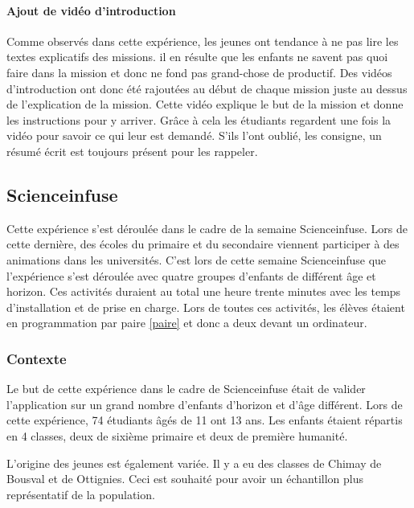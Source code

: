 \paragraph{Ajout de vidéo d'introduction}
Comme observés dans cette expérience, les jeunes ont tendance à ne pas lire les textes explicatifs des missions. il en  résulte que les enfants ne savent pas quoi faire dans la mission et donc ne fond pas grand-chose de productif. Des vidéos d'introduction ont donc été rajoutées au début de chaque mission juste au dessus de l'explication de la mission. Cette vidéo explique le but de la mission et donne les instructions pour y arriver. Grâce à cela les étudiants regardent une fois la vidéo pour savoir ce qui leur est demandé. S'ils l'ont oublié, les consigne, un résumé écrit est toujours présent pour les rappeler.


\subsection{Scienceinfuse}
Cette expérience s'est déroulée dans le cadre de la semaine Scienceinfuse. Lors de cette dernière, des écoles du primaire et du secondaire viennent participer à des animations dans les universités. C'est lors de cette semaine Scienceinfuse que l'expérience s'est déroulée avec quatre groupes d'enfants de différent âge et horizon. Ces activités duraient au total une heure trente minutes avec les temps d'installation et de prise en charge. Lors de toutes ces activités, les élèves étaient en programmation par paire \ref{paire} et donc a deux devant un ordinateur. %

\subsubsection{Contexte}
Le but de cette expérience dans le cadre de Scienceinfuse était de valider l'application sur un grand nombre d'enfants d'horizon et d'âge différent. Lors de cette expérience, 74 étudiants âgés de 11 ont 13 ans. Les enfants étaient répartis en 4 classes, deux de sixième primaire et deux de première humanité.

L'origine des jeunes est également variée. Il y a eu des classes de Chimay de Bousval et de Ottignies. Ceci est souhaité pour avoir un échantillon plus représentatif de la population.

